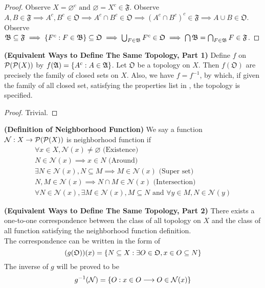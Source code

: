 \documentclass{report}
\begin{document}
\begin{proof}
  Observe $X=\varnothing^c\text{ and }\varnothing=X^c\in \mathfrak{F}$. Observe $A,B\in \mathfrak{F}\implies A^c,B^c \in \mathfrak{O}\implies A^c \cap B^c \in \mathfrak{O} \implies (A^c\cap  B^c)^c \in \mathfrak{F}\implies A \cup B \in \mathfrak{O}$. Observe $\mathfrak{B}\subseteq \mathfrak{F}\implies \{ F^c:F \in \mathfrak{B} \}\subseteq \mathfrak{O}\implies \bigcup_{F\in \mathfrak{B}}F^c \in \mathfrak{O}\implies \bigcap \mathfrak{B}=\bigcap_{F \in \mathfrak{B}}F \in \mathfrak{F}$.
\end{proof}
\begin{theorem}
\label{2.5.3}
\textbf{(Equivalent Ways to Define The Same Topology, Part 1)} Define $f$ on $\mathcal{P}(\mathcal{P}(X))$ by  $f(\mathfrak{A})=\{ A^c:A\in \mathfrak{A} \}$. Let $\mathfrak{O}$ be a topology on $X$. Then  $f(\mathfrak{O})$ are precisely the family of closed sets on $X$. Also, we have $f=f^{-1}$, by which, if given the family of all closed set, satisfying the properties list in , the topology is specified.
\end{theorem}
\begin{proof}
Trivial. 
\end{proof}
\begin{definition}
\label{2.5.4}
\textbf{(Definition of Neighborhood Function)} We say a function $\mathcal{N}:X\rightarrow \mathcal{P}(\mathcal{P}(X))$ is neighborhood function if 
\begin{gather}
\forall x \in X,\mathcal{N}(x)\neq \varnothing\text{ (Existence) }\\
N \in \mathcal{N}(x)\implies x \in N\text{ (Around) }\\
\exists N \in \mathcal{N}(x), N\subseteq M\implies M\in \mathcal{N}(x)\text{ (Super set) }\\
N,M \in \mathcal{N}(x)\implies N \cap M\in \mathcal{N}(x)\text{ (Intersection) }\\
\forall N\in \mathcal{N}(x),\exists M\in \mathcal{N}(x), M \subseteq N\text{ and }\forall y \in M, N \in \mathcal{N}(y)
\end{gather}
\end{definition}
\begin{theorem}
\label{2.5.5}
\textbf{(Equivalent Ways to Define The Same Topology, Part 2)} There exists a one-to-one correspondence between the class of all topology on $X$ and the class of all function satisfying the neighborhood function definition.\\

The correspondence can be written in the form of 
\begin{equation} (g(\mathfrak{O}))(x)=\{ N\subseteq X: \exists O\in \mathfrak{O},x\in O\subseteq N \}
\end{equation}
The inverse of $g$ will be proved to be
 \begin{equation}
g^{-1}(\mathcal{N})=\{ O:x \in O\longrightarrow  O\in \mathcal{N}(x) \}
\end{equation}
\end{theorem}
\end{document}
